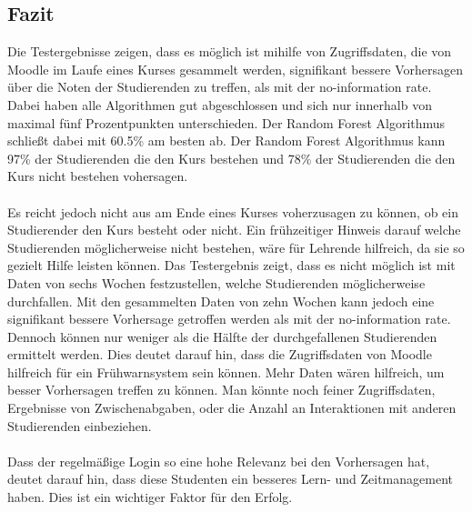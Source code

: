 \subsection{Fazit}
Die Testergebnisse zeigen, dass es möglich ist mihilfe von Zugriffsdaten, die von Moodle im Laufe eines Kurses gesammelt werden, signifikant bessere Vorhersagen über die Noten der Studierenden zu treffen, als mit der \glqq no-information rate\grqq{}.
Dabei haben alle Algorithmen gut abgeschlossen und sich nur innerhalb von maximal fünf Prozentpunkten unterschieden. Der Random Forest Algorithmus schließt dabei mit 60.5\% am besten ab.
Der Random Forest Algorithmus kann 97\% der Studierenden die den Kurs bestehen und 78\% der Studierenden die den Kurs nicht bestehen vohersagen. \cite[S. 14]{Quinn.2020}
\\ \noindent \\ \noindent
Es reicht jedoch nicht aus am Ende eines Kurses voherzusagen zu können, ob ein Studierender den Kurs besteht oder nicht.
Ein frühzeitiger Hinweis darauf welche Studierenden möglicherweise nicht bestehen, wäre für Lehrende hilfreich, da sie so gezielt Hilfe leisten können.
Das Testergebnis zeigt, dass es nicht möglich ist mit Daten von sechs Wochen festzustellen, welche Studierenden möglicherweise durchfallen.
Mit den gesammelten Daten von zehn Wochen kann jedoch eine signifikant bessere Vorhersage getroffen werden als mit der \glqq no-information rate\grqq{}.
Dennoch können nur weniger als die Hälfte der durchgefallenen Studierenden ermittelt werden.
Dies deutet darauf hin, dass die Zugriffsdaten von Moodle hilfreich für ein Frühwarnsystem sein können.
Mehr Daten wären hilfreich, um besser Vorhersagen treffen zu können. Man könnte noch feiner Zugriffsdaten, Ergebnisse von Zwischenabgaben, oder die Anzahl an Interaktionen mit anderen Studierenden einbeziehen. \cite[S. 14ff]{Quinn.2020}
\\ \\ \noindent
Dass der regelmäßige Login so eine hohe Relevanz bei den Vorhersagen hat, deutet darauf hin, dass diese Studenten ein besseres Lern- und Zeitmanagement haben. Dies ist ein wichtiger Faktor für den Erfolg. \cite[S. 15f]{Quinn.2020}